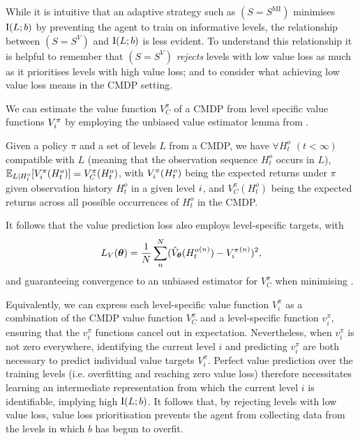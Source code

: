
While it is intuitive that an adaptive strategy such as $(S=S^{\text{MI}})$ minimises $\text{I}(L;b)$ by preventing the agent to train on informative levels, the relationship between $(S=S^{V})$ and $\text{I}(L;b)$ is less evident. To understand this relationship it is helpful to remember that $(S=S^{V})$ \textit{rejects} levels with low value loss as much as it prioritises levels with high value loss; and to consider what achieving low value loss means in the CMDP setting.

We can estimate the value function $V^\pi_C$ of a CMDP from level specific value functions $V^\pi_{i}$ by employing the unbiased value estimator lemma from \citet{instance_invariant}.

\begin{lemma}\label{c3:lem:unbiased_value_estimator}
    Given a policy $\pi$ and a set of levels $L$ from a CMDP, we have $\forall H_t^o$  $(t < \infty)$ compatible with $L$ (meaning that the observation sequence $H_t^o$ occurs in $L$), $\mathbb{E}_{L|H_t^o}[V^\pi_{i}(H_t^o)] = V^\pi_C(H_t^o)$, with $V^\pi_{i}(H_t^o)$ being the expected returns under $\pi$ given observation history $H_t^o$ in a given level $i$, and $V^\pi_C(H_t^o)$ being the expected returns across all possible occurrences of $H_t^o$ in the CMDP.
\end{lemma}
It follows that the value prediction loss also employs level-specific targets, with 
\begin{equation} \label{c3:eq:Lv}
    L_{V}({\bm{\theta}}) = \frac{1}{N} \sum_{n}^N (\hat{V}_{\bm{\theta}}({H_t^{o}}^{(n)}) - {V^\pi_{i}}^{(n)})^2,
\end{equation}
and  guaranteeing convergence to an unbiased estimator for $V^\pi_C$ when minimising . 

Equivalently, we can express each level-specific value function $V^\pi_{i}$ as a combination of the CMDP value function $V^\pi_C$ and a level-specific function $v^\pi_i$,  ensuring that the $v^\pi_i$ functions cancel out in expectation. Nevertheless, when $v^\pi_i$ is not zero everywhere, identifying the current level $i$ and predicting $v^\pi_i$ are both necessary to predict individual value targets $V^\pi_i$. Perfect value prediction over the training levels (i.e. overfitting and reaching zero value loss) therefore necessitates learning an intermediate representation from which the current level $i$ is identifiable, implying high $\text{I}(L;b)$. It follows that, by rejecting levels with low value loss, value loss prioritisation prevents the agent from collecting data from the levels in which $b$ has begun to overfit. 

